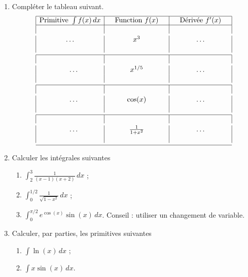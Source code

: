 
\begin{exercice}\label{exoanalyseCTU-0014}


\begin{enumerate}
\item 
Compléter le tableau suivant. 
  \begin{equation}
    \begin{array}{|c|c|c|}\hline 
      \textrm{Primitive } \int f(x)\, dx & \quad\textrm{Function } f(x)\quad &\quad \textrm{D\'eriv\'ee } f'(x)\quad \\\hline 
      \vspace{1mm}&&\\
      \quad\ldots\quad & \quad x^3 \quad&\quad \ldots \quad\\
      \vspace{1mm}&&\\\hline
      \vspace{1mm}&&\\
      \quad\ldots & x^{1/5} & \ldots\\
      \vspace{1mm}&&\\\hline 
      \vspace{1mm}&&\\
      \quad\ldots & \cos(x) & \ldots \\
      \vspace{1mm}&&\\\hline 
      \vspace{1mm}&&\\
      \quad\ldots & \quad \frac{1}{1+x^2}\quad & \ldots \\
      \vspace{1mm}&&\\\hline 
    \end{array}
  \end{equation}
  \item Calculer les intégrales suivantes
    \begin{enumerate}
    \item $\displaystyle \int_2^3 \frac{1}{(x-1)(x+2)} \, dx$ ;
    \item $\displaystyle \int_0^{1/2}\frac{1}{\sqrt{1-x^2}}  \, dx$ ;
    \item $\displaystyle \int_{0}^{\pi/2} e^{\cos(x)}\sin(x) \, dx$. Conseil : utiliser un changement de variable. 
    \end{enumerate}
\item Calculer, par parties,  les primitives suivantes
    \begin{enumerate}
    \item $\displaystyle \int \ln(x) \, dx$ ;
    \item $\displaystyle \int x\sin(x) \, dx$.
    \end{enumerate}
\end{enumerate}


\end{exercice}
